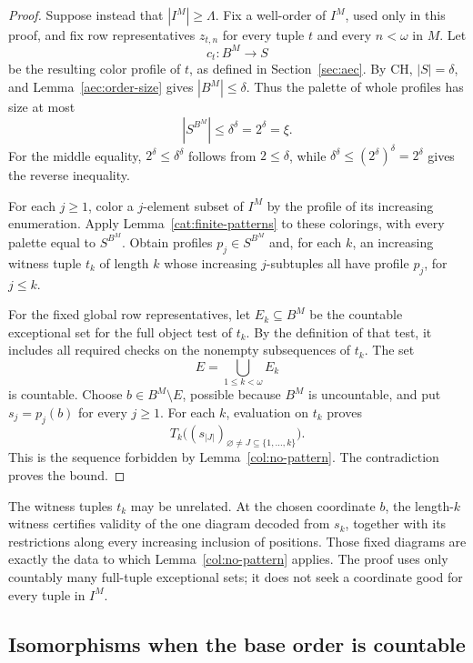 \begin{proof}
Suppose instead that $|I^M|\ge\Lambda$. Fix a well-order of $I^M$,
used only in this proof, and fix row representatives $z_{t,n}$ for
every tuple $t$ and every $n<\omega$ in $M$. Let
\[
 c_t:B^M\longrightarrow S
\]
be the resulting color profile of $t$, as defined in
Section~\ref{sec:aec}. By CH, $|S|=\delta$, and
Lemma~\ref{aec:order-size} gives $|B^M|\le\delta$. Thus the palette
of whole profiles has size at most
\begin{equation}\label{cat:palette}
 |S^{B^M}|\le\delta^\delta=2^\delta=\xi.
\end{equation}
For the middle equality, $2^\delta\le\delta^\delta$ follows from
$2\le\delta$, while
$\delta^\delta\le(2^\delta)^\delta=2^\delta$ gives the reverse
inequality.

For each $j\ge1$, color a $j$-element subset of $I^M$ by the profile
of its increasing enumeration. Apply Lemma~\ref{cat:finite-patterns}
to these colorings, with every palette equal to $S^{B^M}$. Obtain
profiles $p_j\in S^{B^M}$ and, for each $k$, an increasing witness
tuple $t_k$ of length $k$ whose increasing $j$-subtuples all have
profile $p_j$, for $j\le k$.

For the fixed global row representatives, let $E_k\subseteq B^M$
be the countable exceptional set for the full object test of $t_k$.
By the definition of that test, it includes all required checks on
the nonempty subsequences of $t_k$. The set
\[
 E=\bigcup_{1\le k<\omega}E_k
\]
is countable. Choose $b\in B^M\setminus E$, possible because $B^M$
is uncountable, and put $s_j=p_j(b)$ for every $j\ge1$.
For each $k$, evaluation on $t_k$ proves
\[
 T_k\bigl((s_{|J|})_{\varnothing\ne J\subseteq\{1,\ldots,k\}}\bigr).
\]
This is the sequence forbidden by Lemma~\ref{col:no-pattern}.
The contradiction proves the bound.
\end{proof}

\begin{remark}\label{cat:separate-witnesses}
The witness tuples $t_k$ may be unrelated. At the chosen coordinate
$b$, the length-$k$ witness certifies validity of the one diagram
decoded from $s_k$, together with its restrictions along every
increasing inclusion of positions. Those fixed diagrams are exactly
the data to which Lemma~\ref{col:no-pattern} applies. The proof uses
only countably many full-tuple exceptional sets; it does not seek a
coordinate good for every tuple in $I^M$.
\end{remark}

\subsection{Isomorphisms when the base order is countable}

